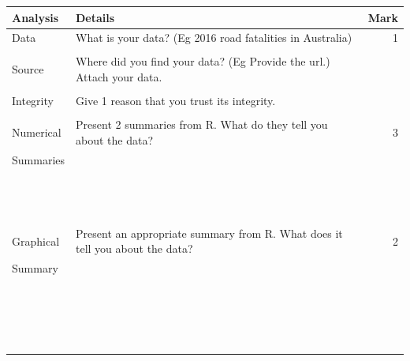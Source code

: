 \documentclass[bigtut]{quiz}\usepackage[]{graphicx}\usepackage[]{color}
\begin{document}
\begin{tutorial}
\begin{tabular}{|l|l|r|} \hline
{\bf Analysis} & {\bf Details} \hspace{11cm} & {\bf Mark} \\ \hline
Data & {\tiny What is your data? (Eg 2016 road fatalities in Australia)} & 1  \\
& & \\ 
Source & {\tiny Where did you find your data? (Eg Provide the url.) Attach your data.} &  \\ 
& & \\ 
Integrity &  {\tiny Give 1 reason that you trust its integrity.} &   \\ 
& & \\ \hline
Numerical  & {\tiny Present 2 summaries from R. What do they tell you about the data?}  & 3 \\ 
Summaries & & \\ 
& & \\ 
& & \\ 
& & \\
& & \\ 
& & \\ 
& & \\ 
& & \\ 
& & \\  
& & \\ 
& & \\ 
& & \\ 
& & \\
& & \\ \hline
Graphical & {\tiny Present an appropriate summary from R. What does it tell you about the data?}  & 2 \\ 
Summary & & \\ 
& & \\ 
& & \\ 
& & \\ 
& & \\ 
& & \\
& & \\ 
& & \\ 
& & \\ 
& & \\ 
& & \\ 
& & \\ 
& & \\ 
& & \\ 
& & \\ 
& & \\ 
& & \\ 
& & \\ 
& & \\ 

\end{tabular}
\end{tutorial}
\end{document}
